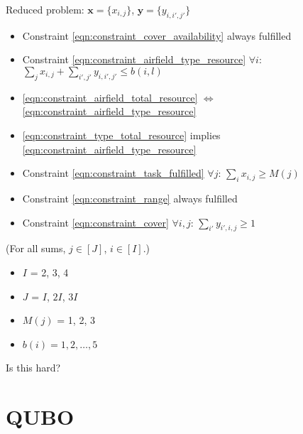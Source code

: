 \documentclass{article}
\begin{document}
\noindent 
Reduced problem:
$\mathbf x = \{x_{i, j}\}$, $\mathbf y = \{y_{i, i' ,j'}\}$
\begin{itemize}
    \item Constraint \eqref{eqn:constraint_cover_availability} always fulfilled
    \item Constraint \eqref{eqn:constraint_airfield_type_resource} $\forall i$: $\sum_j x_{i,j} + \sum_{i', j'} y_{i, i', j'}  \leq b(i,l)$
    \item \eqref{eqn:constraint_airfield_total_resource} $\Leftrightarrow$ \eqref{eqn:constraint_airfield_type_resource}
    \item \eqref{eqn:constraint_type_total_resource} implies \eqref{eqn:constraint_airfield_type_resource}
    \item Constraint \eqref{eqn:constraint_task_fulfilled} $\forall j$: $\sum_{i} x_{i, j} \geq M(j)$
    \item Constraint \eqref{eqn:constraint_range} always fulfilled
    \item Constraint \eqref{eqn:constraint_cover} $\forall i, j$: $\sum_{i'} y_{i', i, j} \geq 1$
\end{itemize}
(For all sums, $j \in [J]$, $i \in [I]$.)

\begin{itemize}
\item $I$ = 2, 3, 4
\item $J$ = $I$, $2I$, $3I$
\item $M(j)$ = 1, 2, 3
\item $b(i) = 1, 2, \ldots, 5$
\end{itemize}
Is this hard?

\section{QUBO}
\end{document}
